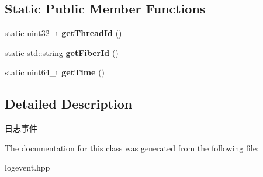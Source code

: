 \subsection*{Static Public Member Functions}
\begin{DoxyCompactItemize}
\item 
\mbox{\label{classdaq_1_1LogEvent_a0354ce048c55395aca2eec5af9050369}} 
static uint32\+\_\+t {\bfseries get\+Thread\+Id} ()
\item 
\mbox{\label{classdaq_1_1LogEvent_a4c6b7e5161f6c1bda5158eae8da4d385}} 
static std\+::string {\bfseries get\+Fiber\+Id} ()
\item 
\mbox{\label{classdaq_1_1LogEvent_a1cb4bfd570cc1edbf9aff16f9b8db832}} 
static uint64\+\_\+t {\bfseries get\+Time} ()
\end{DoxyCompactItemize}


\subsection{Detailed Description}
日志事件 

The documentation for this class was generated from the following file\+:\begin{DoxyCompactItemize}
\item 
logevent.\+hpp\end{DoxyCompactItemize}
